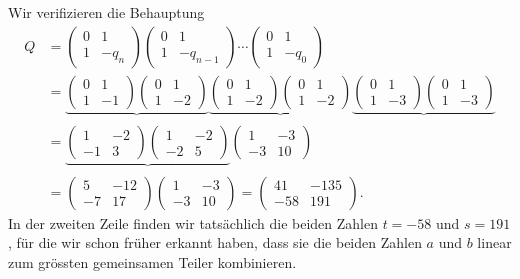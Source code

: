 \begin{beispiel}
Wir verifizieren die Behauptung 
\begin{align*}
Q
&=
\begin{pmatrix} 0&1 \\ 1&-q_n\end{pmatrix}
\begin{pmatrix} 0&1 \\ 1&-q_{n-1}\end{pmatrix}
\cdots
\begin{pmatrix} 0&1 \\ 1&-q_{0}\end{pmatrix}
\\
&=
\underbrace{
\begin{pmatrix} 0&1 \\ 1& -1 \end{pmatrix}
\begin{pmatrix} 0&1 \\ 1& -2 \end{pmatrix}
}_{}
\underbrace{
\begin{pmatrix} 0&1 \\ 1& -2 \end{pmatrix}
\begin{pmatrix} 0&1 \\ 1& -2 \end{pmatrix}
}_{}
\underbrace{
\begin{pmatrix} 0&1 \\ 1& -3 \end{pmatrix}
\begin{pmatrix} 0&1 \\ 1& -3 \end{pmatrix}
}_{}
\\
&=
\underbrace{
\begin{pmatrix} 1 & -2 \\ -1 &  3 \end{pmatrix}
\begin{pmatrix} 1 & -2 \\ -2 &  5 \end{pmatrix}
}_{}
\begin{pmatrix} 1 & -3 \\ -3 & 10 \end{pmatrix}
\\
&=
\begin{pmatrix} 5 & -12 \\ -7 & 17 \end{pmatrix}
\begin{pmatrix} 1 &  -3 \\ -3 & 10 \end{pmatrix}
=
\begin{pmatrix} 41 & -135 \\ -58 & 191 \end{pmatrix}.
\end{align*}
In der zweiten Zeile finden wir tatsächlich die beiden Zahlen $t=-58$ und 
$s=191$, für die wir schon früher erkannt haben, dass sie die beiden
Zahlen $a$ und $b$ linear zum grössten gemeinsamen Teiler kombinieren.


\end{beispiel}
